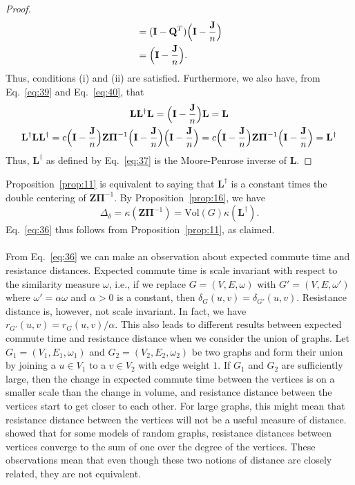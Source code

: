 \begin{proof}
\begin{equation}
\begin{split}
      &= (\mathbf{I} - \mathbf{Q}^{T})\Bigl(\mathbf{I} - \frac{\mathbf{J}}{n}\Bigr) \\
      &= \Bigl(\mathbf{I} - \frac{\mathbf{J}}{n}\Bigr).
   \end{split}
  \end{equation}
  Thus, conditions (i) and (ii) are satisfied. Furthermore, we also have, from
  Eq.~\eqref{eq:39} and Eq.~\eqref{eq:40}, that
  \begin{gather*}
    \mathbf{L}\mathbf{L}^{\dagger}\mathbf{L} = \Bigl(\mathbf{I} -
    \frac{\mathbf{J}}{n}\Bigr) \mathbf{L}
    = \mathbf{L} \\
    \mathbf{L}^{\dagger}\mathbf{L}\mathbf{L}^{\dagger} = c
    \Bigl(\mathbf{I} - \frac{\mathbf{J}}{n}\Bigr) \mathbf{Z}
    \bm{\Pi}^{-1} \Bigl(\mathbf{I} - \frac{\mathbf{J}}{n}\Bigr)
    \Bigl(\mathbf{I} - \frac{\mathbf{J}}{n}\Bigr) = c \Bigl(\mathbf{I}
    - \frac{\mathbf{J}}{n}\Bigr) \mathbf{Z} \bm{\Pi}^{-1}
    \Bigl(\mathbf{I} - \frac{\mathbf{J}}{n}\Bigr) =
    \mathbf{L}^{\dagger}
  \end{gather*}
  Thus, $\mathbf{L}^{\dagger}$ as defined by Eq.~\eqref{eq:37} is the
  Moore-Penrose inverse of $\mathbf{L}$. 
\end{proof}
Proposition~\ref{prop:11} is equivalent to saying that
$\mathbf{L}^{\dagger}$ is a constant times the double centering of
$\mathbf{Z}\bm{\Pi}^{-1}$. By Proposition~\ref{prop:16}, we have 
\begin{equation}
  \label{eq:42}
 \Delta_{\delta} = \kappa(\mathbf{Z}\bm{\Pi}^{-1}) = \mathrm{Vol}(G)
\kappa(\mathbf{L}^{\dagger}). 
\end{equation}
Eq.~\eqref{eq:36} thus follows from Proposition~\ref{prop:11}, as
claimed. \\
\\
\noindent
From Eq.~\eqref{eq:36} we can make an observation about expected
commute time and resistance distances. Expected commute time is scale
invariant with respect to the similarity measure $\omega$, i.e., if we
replace $G = (V,E,\omega)$ with $G' = (V,E,\omega')$ where $\omega' =
\alpha \omega$ and $\alpha > 0$ is a constant, then $\delta_{G}(u,v) =
\delta_{G'}(u,v)$. Resistance distance is, however, not scale
invariant. In fact, we have $r_{G'}(u,v) = r_{G}(u,v)/\alpha$. This
also leads to different results between expected commute time and
resistance distance when we consider the union of graphs. Let $G_1 =
(V_1, E_1, \omega_1)$ and $G_2 = (V_2,E_2, \omega_2)$ be two graphs
and form their union by joining a $u \in V_1$ to a $v \in V_2$ with
edge weight $1$. If $G_1$ and $G_2$ are sufficiently large, then the
change in expected commute time between the vertices is on a smaller
scale than the change in volume, and resistance distance between the
vertices start to get closer to each other. For large graphs, this
might mean that resistance distance between the vertices will not be a
useful measure of distance. \citet{radl09} showed that for some models
of random graphs, resistance distances between vertices converge to
the sum of one over the degree of the vertices. These observations mean that
even though these two notions of distance
are closely related, they are not equivalent.
